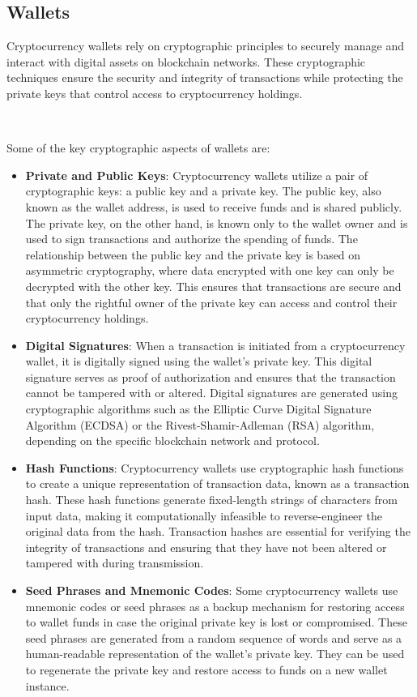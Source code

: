 \subsection{Wallets}
Cryptocurrency wallets rely on cryptographic principles to securely manage and interact with digital assets on blockchain networks. These cryptographic techniques ensure the security and integrity of transactions while protecting the private keys that control access to cryptocurrency holdings.

~

Some of the key cryptographic aspects of wallets are:
\begin{itemize}
    \item \textbf{Private and Public Keys}: Cryptocurrency wallets utilize a pair of cryptographic keys: a public key and a private key. The public key, also known as the wallet address, is used to receive funds and is shared publicly. The private key, on the other hand, is known only to the wallet owner and is used to sign transactions and authorize the spending of funds. The relationship between the public key and the private key is based on asymmetric cryptography, where data encrypted with one key can only be decrypted with the other key. This ensures that transactions are secure and that only the rightful owner of the private key can access and control their cryptocurrency holdings.
    \item \textbf{Digital Signatures}: When a transaction is initiated from a cryptocurrency wallet, it is digitally signed using the wallet's private key. This digital signature serves as proof of authorization and ensures that the transaction cannot be tampered with or altered. Digital signatures are generated using cryptographic algorithms such as the Elliptic Curve Digital Signature Algorithm (ECDSA) or the Rivest-Shamir-Adleman (RSA) algorithm, depending on the specific blockchain network and protocol.
    \item \textbf{Hash Functions}: Cryptocurrency wallets use cryptographic hash functions to create a unique representation of transaction data, known as a transaction hash. These hash functions generate fixed-length strings of characters from input data, making it computationally infeasible to reverse-engineer the original data from the hash. Transaction hashes are essential for verifying the integrity of transactions and ensuring that they have not been altered or tampered with during transmission.
    \item \textbf{Seed Phrases and Mnemonic Codes}: Some cryptocurrency wallets use mnemonic codes or seed phrases as a backup mechanism for restoring access to wallet funds in case the original private key is lost or compromised. These seed phrases are generated from a random sequence of words and serve as a human-readable representation of the wallet's private key. They can be used to regenerate the private key and restore access to funds on a new wallet instance.
\end{itemize}

